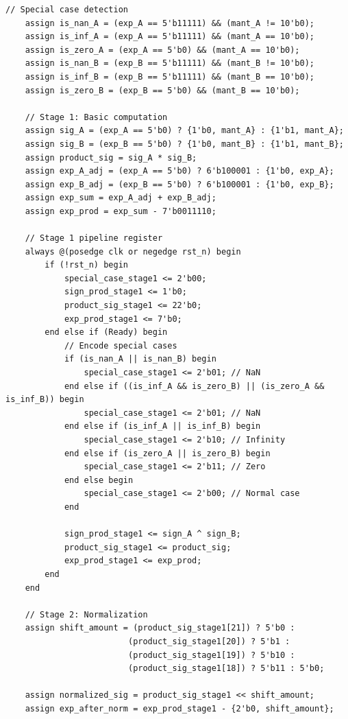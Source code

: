 \documentclass[UTF8]{ctexart}
\begin{document}
\begin{lstlisting}[frame=shadowbox,caption=vRTL251119114743\_779.v]
    // Special case detection
    assign is_nan_A = (exp_A == 5'b11111) && (mant_A != 10'b0);
    assign is_inf_A = (exp_A == 5'b11111) && (mant_A == 10'b0);
    assign is_zero_A = (exp_A == 5'b0) && (mant_A == 10'b0);
    assign is_nan_B = (exp_B == 5'b11111) && (mant_B != 10'b0);
    assign is_inf_B = (exp_B == 5'b11111) && (mant_B == 10'b0);
    assign is_zero_B = (exp_B == 5'b0) && (mant_B == 10'b0);
    
    // Stage 1: Basic computation
    assign sig_A = (exp_A == 5'b0) ? {1'b0, mant_A} : {1'b1, mant_A};
    assign sig_B = (exp_B == 5'b0) ? {1'b0, mant_B} : {1'b1, mant_B};
    assign product_sig = sig_A * sig_B;
    assign exp_A_adj = (exp_A == 5'b0) ? 6'b100001 : {1'b0, exp_A};
    assign exp_B_adj = (exp_B == 5'b0) ? 6'b100001 : {1'b0, exp_B};
    assign exp_sum = exp_A_adj + exp_B_adj;
    assign exp_prod = exp_sum - 7'b0011110;
    
    // Stage 1 pipeline register
    always @(posedge clk or negedge rst_n) begin
        if (!rst_n) begin
            special_case_stage1 <= 2'b00;
            sign_prod_stage1 <= 1'b0;
            product_sig_stage1 <= 22'b0;
            exp_prod_stage1 <= 7'b0;
        end else if (Ready) begin
            // Encode special cases
            if (is_nan_A || is_nan_B) begin
                special_case_stage1 <= 2'b01; // NaN
            end else if ((is_inf_A && is_zero_B) || (is_zero_A && is_inf_B)) begin
                special_case_stage1 <= 2'b01; // NaN
            end else if (is_inf_A || is_inf_B) begin
                special_case_stage1 <= 2'b10; // Infinity
            end else if (is_zero_A || is_zero_B) begin
                special_case_stage1 <= 2'b11; // Zero
            end else begin
                special_case_stage1 <= 2'b00; // Normal case
            end
            
            sign_prod_stage1 <= sign_A ^ sign_B;
            product_sig_stage1 <= product_sig;
            exp_prod_stage1 <= exp_prod;
        end
    end
    
    // Stage 2: Normalization
    assign shift_amount = (product_sig_stage1[21]) ? 5'b0 :
                         (product_sig_stage1[20]) ? 5'b1 :
                         (product_sig_stage1[19]) ? 5'b10 :
                         (product_sig_stage1[18]) ? 5'b11 : 5'b0;
                         
    assign normalized_sig = product_sig_stage1 << shift_amount;
    assign exp_after_norm = exp_prod_stage1 - {2'b0, shift_amount};
    

\end{lstlisting}
\end{document}
